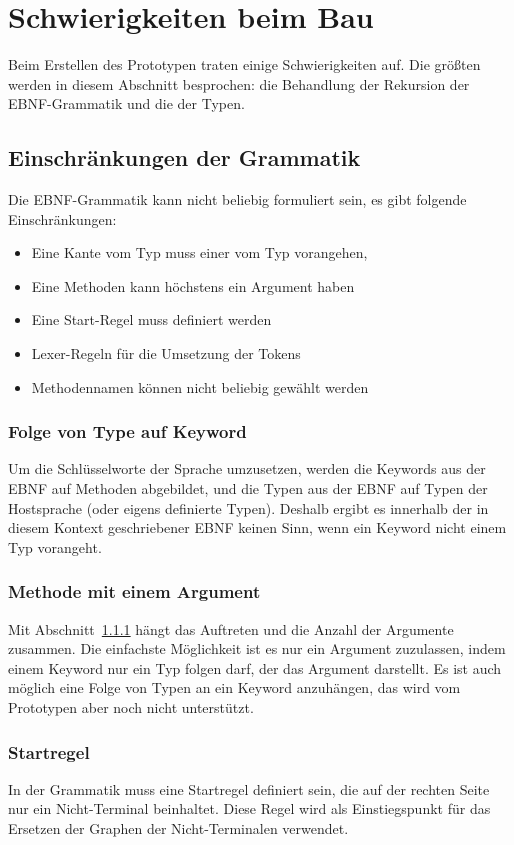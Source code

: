 \documentclass[../InterneDSLs.tex]{subfiles}
\begin{document}
\section{Schwierigkeiten beim Bau}
Beim Erstellen des Prototypen traten einige Schwierigkeiten auf. Die größten werden in diesem Abschnitt besprochen: die Behandlung der Rekursion der EBNF-Grammatik und die der Typen.

\subsection{Einschränkungen der Grammatik}
Die EBNF-Grammatik kann nicht beliebig formuliert sein, es gibt folgende Einschränkungen:
\begin{itemize}
	\item Eine Kante vom Typ  muss einer vom Typ  vorangehen,
	\item Eine Methoden kann höchstens ein Argument haben
	\item Eine Start-Regel muss definiert werden
	\item Lexer-Regeln für die Umsetzung der Tokens
	\item Methodennamen können nicht beliebig gewählt werden
\end{itemize}

\subsubsection{Folge von Type auf Keyword}\label{SEC:TypeFollowsKeyword}
Um die Schlüsselworte der Sprache umzusetzen, werden die Keywords aus der EBNF auf Methoden abgebildet, und die Typen aus der EBNF auf Typen der Hostsprache (oder eigens definierte Typen). Deshalb ergibt es innerhalb der in diesem Kontext geschriebener EBNF keinen Sinn, wenn ein Keyword nicht einem Typ vorangeht.

\subsubsection{Methode mit einem Argument}
Mit Abschnitt~\ref{SEC:TypeFollowsKeyword} hängt das Auftreten und die Anzahl der Argumente zusammen. Die einfachste Möglichkeit ist es nur ein Argument zuzulassen, indem einem Keyword nur ein Typ folgen darf, der das Argument darstellt. Es ist auch möglich eine Folge von Typen an ein Keyword anzuhängen, das wird vom Prototypen aber noch nicht unterstützt.

\subsubsection{Startregel}
In der Grammatik muss eine Startregel definiert sein, die auf der rechten Seite nur ein Nicht-Terminal beinhaltet. Diese Regel wird als Einstiegspunkt für das Ersetzen der Graphen der Nicht-Terminalen verwendet.
\end{document}
